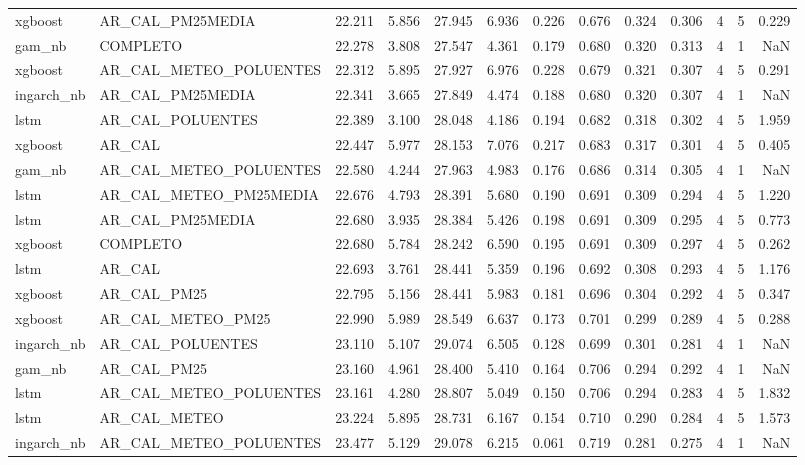 \begin{tabular}{llrrrrrrrrrrr}
xgboost & AR_CAL_PM25MEDIA & 22.211 & 5.856 & 27.945 & 6.936 & 0.226 & 0.676 & 0.324 & 0.306 & 4 & 5 & 0.229 \\
gam_nb & COMPLETO & 22.278 & 3.808 & 27.547 & 4.361 & 0.179 & 0.680 & 0.320 & 0.313 & 4 & 1 & NaN \\
xgboost & AR_CAL_METEO_POLUENTES & 22.312 & 5.895 & 27.927 & 6.976 & 0.228 & 0.679 & 0.321 & 0.307 & 4 & 5 & 0.291 \\
ingarch_nb & AR_CAL_PM25MEDIA & 22.341 & 3.665 & 27.849 & 4.474 & 0.188 & 0.680 & 0.320 & 0.307 & 4 & 1 & NaN \\
lstm & AR_CAL_POLUENTES & 22.389 & 3.100 & 28.048 & 4.186 & 0.194 & 0.682 & 0.318 & 0.302 & 4 & 5 & 1.959 \\
xgboost & AR_CAL & 22.447 & 5.977 & 28.153 & 7.076 & 0.217 & 0.683 & 0.317 & 0.301 & 4 & 5 & 0.405 \\
gam_nb & AR_CAL_METEO_POLUENTES & 22.580 & 4.244 & 27.963 & 4.983 & 0.176 & 0.686 & 0.314 & 0.305 & 4 & 1 & NaN \\
lstm & AR_CAL_METEO_PM25MEDIA & 22.676 & 4.793 & 28.391 & 5.680 & 0.190 & 0.691 & 0.309 & 0.294 & 4 & 5 & 1.220 \\
lstm & AR_CAL_PM25MEDIA & 22.680 & 3.935 & 28.384 & 5.426 & 0.198 & 0.691 & 0.309 & 0.295 & 4 & 5 & 0.773 \\
xgboost & COMPLETO & 22.680 & 5.784 & 28.242 & 6.590 & 0.195 & 0.691 & 0.309 & 0.297 & 4 & 5 & 0.262 \\
lstm & AR_CAL & 22.693 & 3.761 & 28.441 & 5.359 & 0.196 & 0.692 & 0.308 & 0.293 & 4 & 5 & 1.176 \\
xgboost & AR_CAL_PM25 & 22.795 & 5.156 & 28.441 & 5.983 & 0.181 & 0.696 & 0.304 & 0.292 & 4 & 5 & 0.347 \\
xgboost & AR_CAL_METEO_PM25 & 22.990 & 5.989 & 28.549 & 6.637 & 0.173 & 0.701 & 0.299 & 0.289 & 4 & 5 & 0.288 \\
ingarch_nb & AR_CAL_POLUENTES & 23.110 & 5.107 & 29.074 & 6.505 & 0.128 & 0.699 & 0.301 & 0.281 & 4 & 1 & NaN \\
gam_nb & AR_CAL_PM25 & 23.160 & 4.961 & 28.400 & 5.410 & 0.164 & 0.706 & 0.294 & 0.292 & 4 & 1 & NaN \\
lstm & AR_CAL_METEO_POLUENTES & 23.161 & 4.280 & 28.807 & 5.049 & 0.150 & 0.706 & 0.294 & 0.283 & 4 & 5 & 1.832 \\
lstm & AR_CAL_METEO & 23.224 & 5.895 & 28.731 & 6.167 & 0.154 & 0.710 & 0.290 & 0.284 & 4 & 5 & 1.573 \\
ingarch_nb & AR_CAL_METEO_POLUENTES & 23.477 & 5.129 & 29.078 & 6.215 & 0.061 & 0.719 & 0.281 & 0.275 & 4 & 1 & NaN \\

\end{tabular}
